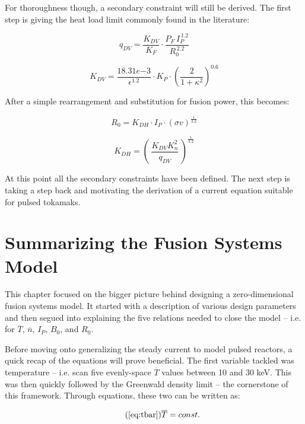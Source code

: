 For thoroughness though, a secondary constraint will still be derived. The first step is giving the heat load limit commonly found in the literature:

\begin{equation}
  q_{DV} = \frac{ K_{DV} }{ K_F} \cdot \frac{ P_F \, I_P^{\,1.2} }{ R_0^{\,2.2} }
\end{equation}

\begin{equation}
	K_{DV} = \frac{18.31e{-3}}{\epsilon^{1.2}} \cdot K_P \cdot \left( \frac{2}{1+\kappa^2} \right) ^ {0.6}
\end{equation}

After a simple rearrangement and substitution for fusion power, this becomes:

\begin{equation}
	R_0 = K_{DH} \cdot I_P \cdot (\sigma v)^ {\frac{1}{3.2}} 
\end{equation}

\begin{equation}
	K_{DH} = \left( \, \frac{ K_{DV} K_n^2 }{ q_{DV} } \, \right) ^ {\frac{1}{3.2}}
\end{equation}

At this point all the secondary constraints have been defined. The next step is taking a step back and motivating the derivation of a current equation suitable for pulsed tokamaks.

\section{Summarizing the Fusion Systems Model}

This chapter focused on the bigger picture behind designing a zero-dimensional fusion systems model. It started with a description of various design parameters and then segued into explaining the five relations needed to close the model -- i.e. for $\overline T$, $\overline n$, $I_P$, $B_0$, and $R_0$.

Before moving onto generalizing the steady current to model pulsed reactors, a quick recap of the equations will prove beneficial. The first variable tackled was temperature -- i.e. scan five evenly-space $\overline T$ values between 10 and 30 keV. This was then quickly followed by the Greenwald density limit -- the cornerstone of this framework. Through equations, these two can be written as:

\begin{equation}
	\tag{\ref{eq:tbar}}
	\overline T = const.
\end{equation}

